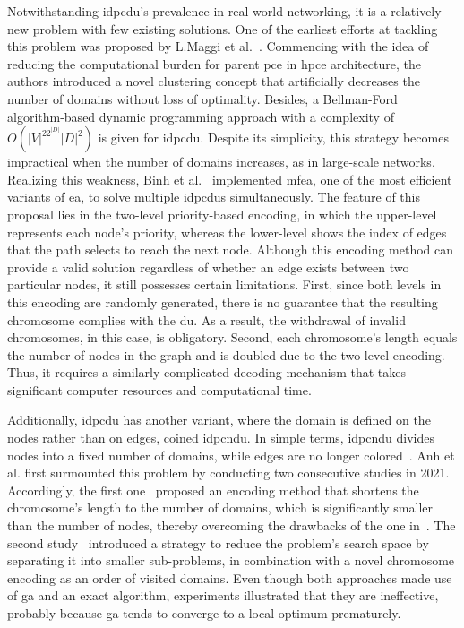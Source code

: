 Notwithstanding \gls{idpcdu}'s prevalence in real-world networking, it is a relatively new problem with few existing solutions. One of the earliest efforts at tackling this problem was proposed by L.Maggi et al.~\cite{maggi2018domain}. Commencing with the idea of reducing the computational burden for parent \gls{pce} in \gls{hpce} architecture, the authors introduced a novel clustering concept that artificially decreases the number of domains without loss of optimality. Besides, a Bellman-Ford algorithm-based dynamic programming approach with a complexity of $O(|V|^22^{|D|}|D|^2)$ is given for \gls{idpcdu}. Despite its simplicity, this strategy becomes impractical when the number of domains increases, as in large-scale networks. 
Realizing this weakness, Binh et al.~\cite{binh2020multifactorial} implemented \gls{mfea}, one of the most efficient variants of \gls{ea}, to solve multiple \gls{idpcdu}s simultaneously. The feature of this proposal lies in the two-level priority-based encoding, in which the upper-level represents each node's priority, whereas the lower-level shows the index of edges that the path selects to reach the next node. Although this encoding method can provide a valid solution regardless of whether an edge exists between two particular nodes, it still possesses certain limitations. First, since both levels in this encoding are randomly generated, there is no guarantee that the resulting chromosome complies with the \gls{du}. As a result, the withdrawal of invalid chromosomes, in this case, is obligatory. Second, each chromosome's length equals the number of nodes in the graph and is doubled due to the two-level encoding. Thus, it requires a similarly complicated decoding mechanism that takes significant computer resources and computational time.

Additionally, \gls{idpcdu} has another variant, where the domain is defined on the nodes rather than on edges, coined \acrshort{idpcndu}. In simple terms, \acrshort{idpcndu} divides nodes into a fixed number of domains, while edges are no longer colored~\cite{maggi2018domain}. Anh et al. first surmounted this problem by conducting two consecutive studies in 2021. Accordingly, the first one~\cite{do2021two} proposed an encoding method that shortens the chromosome's length to the number of domains, which is significantly smaller than the number of nodes, thereby overcoming the drawbacks of the one in~\cite{binh2020multifactorial}. The second study~\cite{binh2021two} introduced a strategy to reduce the problem's search space by separating it into smaller sub-problems, in combination with a novel chromosome encoding as an order of visited domains. Even though both approaches made use of \gls{ga} and an exact algorithm, experiments illustrated that they are ineffective, probably because \gls{ga} tends to converge to a local optimum prematurely.

